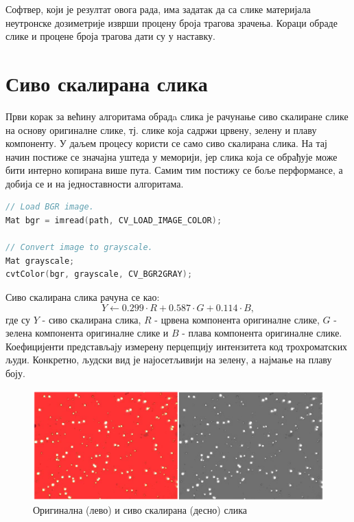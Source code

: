 \documentclass[11pt,a4paper,serbian,oneside]{book}
\begin{document}
Софтвер, који је резултат овога рада, има задатак да са слике материјала неутронске дозиметрије изврши процену броја трагова зрачења. Кораци обраде слике и процене броја трагова дати су у наставку.

\section{Сиво скалирана слика}

Први корак за већину алгоритама обрадa слика је рачунање сиво скалиране слике на основу оригиналне слике, тј. слике која садржи црвену, зелену и плаву компоненту. У даљем процесу користи се само сиво скалирана слика. На тај начин  постиже се значајна уштеда у меморији, јер слика која се обрађује може бити интерно копирана више пута.  Самим тим постижу се боље перформансе, а добија се и на једноставности алгоритама.

\begin{lstlisting}[language=C++,label=lst:grayscale,caption=Рачунање сиво скалиране слике]
// Load BGR image.
Mat bgr = imread(path, CV_LOAD_IMAGE_COLOR);

// Convert image to grayscale.
Mat grayscale;
cvtColor(bgr, grayscale, CV_BGR2GRAY);
\end{lstlisting}

Сиво скалирана слика рачуна се као:
\begin{equation}
Y \gets 0.299 \cdot R + 0.587 \cdot G + 0.114 \cdot B,
\end{equation}
где су $Y$ - сиво скалирана слика, $R$ - црвена компонента оригиналне слике, $G$ - зелена компонента оригиналне слике и $B$ - плава компонента оригиналне слике. Коефицијенти представљају измерену перцепцију интензитета код трохроматских људи. Конкретно, људ\-ски вид је најосетљивији на зелену, а најмање на плаву боју.

\begin{figure}
\begin{center}
\includegraphics[width=150mm]{images/original+grayscale.png}
\end{center}
\caption{Оригинална (лево) и сиво скалирана (десно) слика}
\label{fig:cv}
\end{figure}
\end{document}

